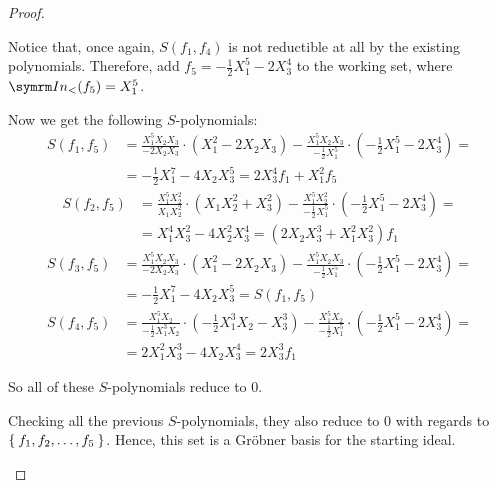 \begin{proof}
\begin{itemize}
    Notice that, once again, \(S(f_1, f_4)\) is not reductible at all by the existing polynomials. Therefore, add \(f_5 = -\frac{1}{2} X_1^5 - 2 X_3^4\) to the working set, where \(\In(f_5) = X_1^5\).
    
    Now we get the following \(S\)-polynomials:
    \begin{align*}
        S(f_1, f_5) &= \frac{X_1^5 X_2 X_3}{-2 X_2 X_3} \cdot (X_1^2 - 2 X_2 X_3) - \frac{X_1^5 X_2 X_3}{-\frac{1}{2} X_1^5} \cdot (-\frac{1}{2} X_1^5 - 2 X_3^4) = \\
        &= -\frac{1}{2} X_1^7 - 4 X_2 X_3^5 = 2 X_3^4 f_1 + X_1^2 f_5
    \end{align*}
    \begin{align*}
        S(f_2, f_5) &= \frac{X_1^5 X_2^2}{X_1 X_2^2} \cdot (X_1 X_2^2 + X_3^2) - \frac{X_1^5 X_2^2}{-\frac{1}{2} X_1^5} \cdot (-\frac{1}{2} X_1^5 - 2 X_3^4) = \\
        &= X_1^4 X_3^2 - 4 X_2^2 X_3^4 = (2 X_2 X_3^3 + X_1^2 X_3^2) f_1
    \end{align*}
    \begin{align*}
        S(f_3, f_5) &= \frac{X_1^5 X_2 X_3}{-2 X_2 X_3} \cdot (X_1^2 - 2 X_2 X_3) - \frac{X_1^5 X_2 X_3}{-\frac{1}{2} X_1^5} \cdot (- \frac{1}{2} X_1^5 - 2 X_3^4) = \\
        &= - \frac{1}{2} X_1^7 - 4 X_2 X_3^5 = S(f_1, f_5)
    \end{align*}
    \begin{align*}
        S(f_4, f_5) &= \frac{X_1^5 X_2}{-\frac{1}{2} X_1^3 X_2} \cdot (-\frac{1}{2} X_1^3 X_2 - X_3^3) - \frac{X_1^5 X_2}{-\frac{1}{2} X_1^5} \cdot (-\frac{1}{2} X_1^5 - 2 X_3^4) = \\
        &= 2 X_1^2 X_3^3 - 4 X_2 X_3^4 = 2 X_3^3 f_1
    \end{align*}
    
    So all of these \(S\)-polynomials reduce to \(0\).
    
    Checking all the previous \(S\)-polynomials, they also reduce to \(0\) with regards to \(\Set{f_1, f_2, \dots, f_5}\). Hence, this set is a Gröbner basis for the starting ideal.
\end{itemize}
\end{proof}

